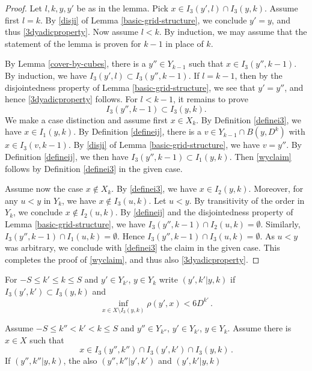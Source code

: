 \begin{proof}
Let $l,k,y,y'$ be as in the lemma. Pick $x\in I_3(y',l)\cap I_3(y,k)$. Assume first $l=k$. By \eqref{disji} of Lemma \ref{basic-grid-structure}, we conclude $y'=y$, and thus \eqref{3dyadicproperty}. Now assume $l<k$. By induction, we may assume that the statement of the lemma is proven for $k-1$ in place of $k$.

By Lemma \ref{cover-by-cubes}, there is a $y''\in Y_{k-1}$ such that $x\in I_3(y'',k-1)$. By induction, we have $I_3(y',l)\subset I_3(y'',k-1)$. If $l=k-1$, then by the disjointedness property of Lemma \ref{basic-grid-structure}, we see that $y'=y''$, and hence \eqref{3dyadicproperty} follows. For $l<k-1$, it remains to prove
\begin{equation}\label{wyclaim}
I_3(y'',k-1)\subset I_3(y,k).
\end{equation}
We make a case distinction and assume first $x\in X_k$. By Definition \eqref{definei3}, we have $x\in I_1(y,k)$. By Definition \eqref{defineij}, there is a $v\in Y_{k-1}\cap B(y,D^k)$ with $x\in I_3(v,k-1)$. By \eqref{disji} of Lemma \ref{basic-grid-structure}, we have $v=y''$. By Definition \eqref{defineij}, we then have $I_3(y'',k-1)\subset I_1(y,k)$. Then \eqref{wyclaim} follows by Definition \eqref{definei3} in the given case.

Assume now the case $x\notin X_k$. By \eqref{definei3}, we have $x\in I_2(y,k)$. Moreover, for any $u<y$ in $Y_k$, we have $x\not\in I_3(u,k)$. Let $u<y$. By transitivity of the order in $Y_k$, we conclude $x\not \in I_2(u,k)$. By \eqref{defineij} and the disjointedness property of Lemma \ref{basic-grid-structure}, we have $I_3(y'',k-1)\cap  I_2(u,k)= \emptyset$. Similarly, $I_3(y'',k-1)\cap  I_1(u,k)= \emptyset$. Hence $I_3(y'',k-1)\cap  I_3(u,k)=\emptyset$. As $u<y$ was arbitrary, we conclude with \eqref{definei3} the claim in the given case. This completes the proof of \eqref{wyclaim}, and thus also \eqref{3dyadicproperty}.
\end{proof}




For $-S\le k'\le k\le S$ and $y'\in Y_{k'}$, $y\in Y_k$
write  $(y',k'|y,k)$ if $I_3(y',k')\subset I_3(y,k)$ and
\begin{equation}\label{bdcond}
    \inf_{x\in X\setminus I_3(y,k)}\rho(y',x)<6D^{k'}\, .
\end{equation}


\begin{lemma}
\label{transitive-boundary}
Assume $-S\le k''< k'< k\le S$ and
$y''\in Y_{k''}$, $y'\in Y_{k'}$, $y\in Y_k$.
Assume there is $x\in X$ such that
\begin{equation}
x\in I_3(y'',k'')\cap I_3(y',k')\cap I_3(y,k)\, .
\end{equation}
If $(y'',k''|y,k)$, the also
$(y'',k''|y',k')$ and $(y',k'|y,k)$
\end{lemma}

